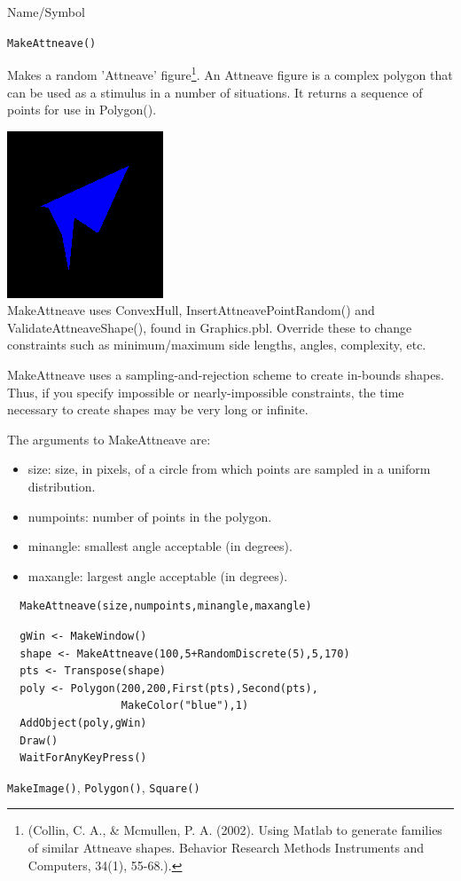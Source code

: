 \begin{desc}{Name/Symbol}
\item[Name/Symbol]	\verb+MakeAttneave()+

\item[Description] Makes a random 'Attneave' figure\footnote{(Collin, C. A., \& Mcmullen, P. A. (2002). Using Matlab to generate  families of similar Attneave shapes. Behavior Research Methods
 Instruments and Computers, 34(1), 55-68.).}. An Attneave figure is a complex polygon that can be used as a
stimulus in a number of situations.  It returns a sequence
of points for use in Polygon().

{\centering
\includegraphics[scale=.5]{images/attneave.png}
}
\\

MakeAttneave uses ConvexHull,  InsertAttneavePointRandom() and
ValidateAttneaveShape(), found in Graphics.pbl.  Override these
to change constraints such as  minimum/maximum side
lengths, angles, complexity, etc.

MakeAttneave uses a sampling-and-rejection scheme to create in-bounds
shapes.  Thus, if you specify impossible or nearly-impossible
constraints, the time necessary to create shapes may be very long or
infinite.

 The arguments to MakeAttneave are:
\begin{itemize}
\item size: size, in pixels, of a circle from which points are
  sampled in a uniform distribution. 
\item numpoints: number of points in the polygon.
\item minangle: smallest angle acceptable (in degrees).
\item maxangle: largest angle acceptable  (in degrees).
\end{itemize}

\item[Usage]
\begin{verbatim}
  MakeAttneave(size,numpoints,minangle,maxangle)
\end{verbatim}

\item[Example]	
\begin{verbatim}
  gWin <- MakeWindow()
  shape <- MakeAttneave(100,5+RandomDiscrete(5),5,170)
  pts <- Transpose(shape)
  poly <- Polygon(200,200,First(pts),Second(pts),
                  MakeColor("blue"),1)
  AddObject(poly,gWin)
  Draw()
  WaitForAnyKeyPress()
\end{verbatim}
\item[See Also]	\verb+MakeImage()+, \verb+Polygon()+, \verb+Square()+
\end{desc}






